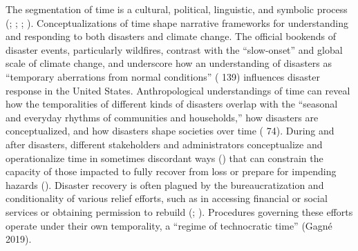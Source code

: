\documentclass[
]{article}
\begin{document}
The segmentation of time is a cultural, political, linguistic, and symbolic process (; ; ; ). Conceptualizations of time shape narrative frameworks for understanding and responding to both disasters and climate change. The official bookends of disaster events, particularly wildfires, contrast with the ``slow-onset'' and global scale of climate change, and underscore how an understanding of disasters as ``temporary aberrations from normal conditions'' ( 139) influences disaster response in the United States. Anthropological understandings of time can reveal how the temporalities of different kinds of disasters overlap with the ``seasonal and everyday rhythms of communities and households,'' how disasters are conceptualized, and how disasters shape societies over time ( 74). During and after disasters, different stakeholders and administrators conceptualize and operationalize time in sometimes discordant ways () that can constrain the capacity of those impacted to fully recover from loss or prepare for impending hazards (). Disaster recovery is often plagued by the bureaucratization and conditionality of various relief efforts, such as in accessing financial or social services or obtaining permission to rebuild (; ). Procedures governing these efforts operate under their own temporality, a ``regime of technocratic time'' (Gagné 2019).
\end{document}
